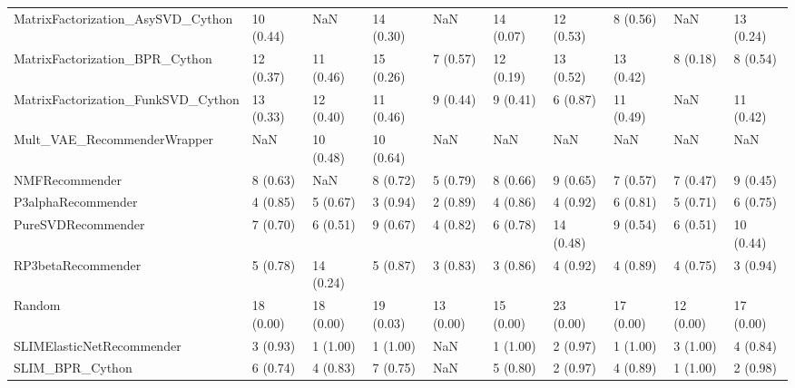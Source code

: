 \begin{tabular}{llllllllll}
  MatrixFactorization\_AsySVD\_Cython &                10 (0.44) &         NaN &     14 (0.30) &          NaN &            14 (0.07) &           12 (0.53) &          8 (0.56) &                NaN &         13 (0.24) \\
     MatrixFactorization\_BPR\_Cython &                12 (0.37) &   11 (0.46) &     15 (0.26) &     7 (0.57) &            12 (0.19) &           13 (0.52) &         13 (0.42) &           8 (0.18) &          8 (0.54) \\
 MatrixFactorization\_FunkSVD\_Cython &                13 (0.33) &   12 (0.40) &     11 (0.46) &     9 (0.44) &             9 (0.41) &            6 (0.87) &         11 (0.49) &                NaN &         11 (0.42) \\
        Mult\_VAE\_RecommenderWrapper &                      NaN &   10 (0.48) &     10 (0.64) &          NaN &                  NaN &                 NaN &               NaN &                NaN &               NaN \\
                     NMFRecommender &                 8 (0.63) &         NaN &      8 (0.72) &     5 (0.79) &             8 (0.66) &            9 (0.65) &          7 (0.57) &           7 (0.47) &          9 (0.45) \\
                 P3alphaRecommender &                 4 (0.85) &    5 (0.67) &      3 (0.94) &     2 (0.89) &             4 (0.86) &            4 (0.92) &          6 (0.81) &           5 (0.71) &          6 (0.75) \\
                 PureSVDRecommender &                 7 (0.70) &    6 (0.51) &      9 (0.67) &     4 (0.82) &             6 (0.78) &           14 (0.48) &          9 (0.54) &           6 (0.51) &         10 (0.44) \\
                 RP3betaRecommender &                 5 (0.78) &   14 (0.24) &      5 (0.87) &     3 (0.83) &             3 (0.86) &            4 (0.92) &          4 (0.89) &           4 (0.75) &          3 (0.94) \\
                             Random &                18 (0.00) &   18 (0.00) &     19 (0.03) &    13 (0.00) &            15 (0.00) &           23 (0.00) &         17 (0.00) &          12 (0.00) &         17 (0.00) \\
          SLIMElasticNetRecommender &                 3 (0.93) &    1 (1.00) &      1 (1.00) &          NaN &             1 (1.00) &            2 (0.97) &          1 (1.00) &           3 (1.00) &          4 (0.84) \\
                    SLIM\_BPR\_Cython &                 6 (0.74) &    4 (0.83) &      7 (0.75) &          NaN &             5 (0.80) &            2 (0.97) &          4 (0.89) &           1 (1.00) &          2 (0.98) \\

\end{tabular}
